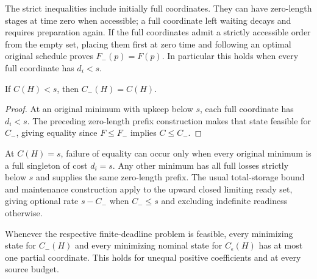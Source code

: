 The strict inequalities include initially full coordinates. They can have
zero-length stages at time zero when accessible; a full coordinate left
waiting decays and requires preparation again. If the full coordinates
admit a strictly accessible order from the empty set, placing them first
at zero time and following an optimal original schedule proves
$F_-(p)=F(p)$. In particular this holds when every full coordinate has
$d_i<s$.

\begin{proposition}
\label{prop:precision-slack}
If $C(H)<s$, then $C_-(H)=C(H)$.
\end{proposition}

\begin{proof}
At an original minimum with upkeep below $s$, each full coordinate has
$d_i<s$. The preceding zero-length prefix construction makes that state
feasible for $C_-$, giving equality since $F\leq F_-$ implies $C\leq C_-$.
\end{proof}

At $C(H)=s$, failure of equality can occur only when every original
minimum is a full singleton of cost $d_i=s$. Any other minimum has all
full losses strictly below $s$ and supplies the same zero-length prefix.
The usual total-storage bound and maintenance construction apply to the
upward closed limiting ready set, giving optional rate $s-C_-$ when
$C_-\leq s$ and excluding indefinite readiness otherwise.

\begin{proposition}
\label{prop:precision-concentration}
Whenever the respective finite-deadline problem is feasible, every
minimizing state for $C_-(H)$ and every minimizing nominal state for
$C_\epsilon(H)$ has at most one partial coordinate. This holds for unequal
positive coefficients and at every source budget.
\end{proposition}

